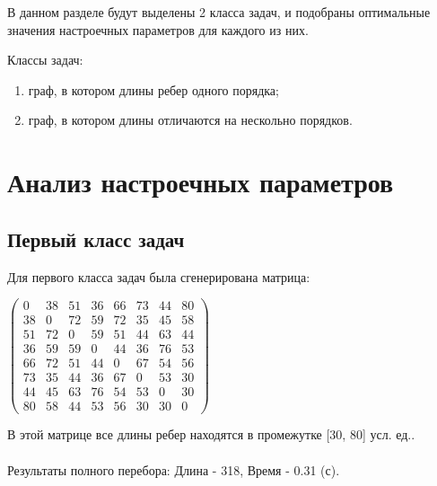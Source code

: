\documentclass[12pt]{report}
\begin{document}
	В данном разделе будут выделены 2 класса задач, и подобраны оптимальные значения настроечных параметров для каждого из них.
	
	Классы задач:
	\begin{enumerate}
		\item граф, в котором длины ребер одного порядка;
		\item граф, в котором длины отличаются на нескольно порядков.
	\end{enumerate}
	
	\section{Анализ настроечных параметров}
	\subsection{Первый класс задач}
	
	Для первого класса задач была сгенерирована матрица:
	\begin{center}
		$
		\begin{pmatrix}
			0 & 38 & 51 & 36 & 66 & 73 & 44 & 80 \\ 
			38 & 0 & 72 & 59 & 72 & 35 & 45 & 58 \\ 
			51 &  72 & 0 & 59 & 51 & 44 & 63 & 44 \\
			36 & 59 & 59 & 0 & 44 & 36 & 76 & 53 \\
			66 & 72 & 51 & 44 & 0 & 67 & 54 & 56 \\
			73 & 35 & 44 & 36 & 67 & 0 & 53 & 30 \\
			44 & 45 & 63 & 76 & 54 & 53 & 0 & 30 \\
			80 & 58 & 44 & 53 & 56 & 30 & 30 & 0 
		\end{pmatrix}
		$
	\end{center}

	В этой матрице все длины ребер находятся в промежутке [30, 80] усл. ед..
	~\\
	~\\
	Результаты полного перебора: Длина - 318, Время - 0.31 (с).
\end{document}
